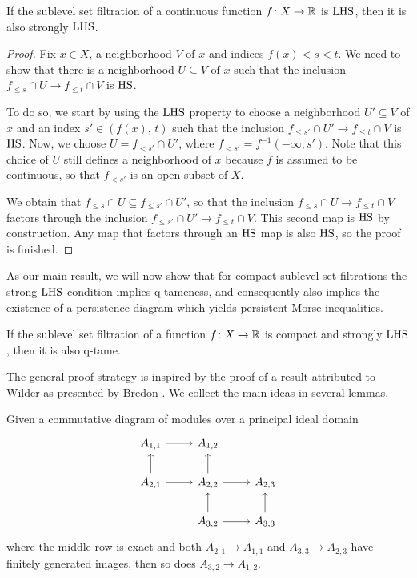 \begin{thm}\label{thm:hlc_to_strong_hlc}
    If the sublevel set filtration of a continuous function $f \colon X \to \mathbb{R}$ is $\mathrm{LHS}$, then it is also strongly $\mathrm{LHS}$.
\end{thm}
\begin{proof}
    Fix $x \in X$, a neighborhood $V$ of $x$ and indices $f(x) < s < t$.
	We need to show that there is a neighborhood $U \subseteq V$ of $x$ such that the inclusion $f_{\leq s} \cap U \to f_{\leq t} \cap V$ is $\mathrm{HS}$.
    
    To do so, we start by using the $\mathrm{LHS}$ property to choose a neighborhood $U' \subseteq V$ of $x$ and an index $s' \in (f(x),\, t)$ such that the inclusion $f_{\leq s'} \cap U' \to f_{\leq t} \cap V$ is $\mathrm{HS}$.
    Now, we choose $U = f_{< s'} \cap U'$, where $f_{< s'} = f^{-1} (-\infty, s')$.
    Note that this choice of $U$ still defines a neighborhood of $x$ because $f$ is assumed to be continuous, so that $f_{< s'}$ is an open subset of $X$.
    
    We obtain that $f_{\leq s} \cap U \subseteq f_{\leq s'} \cap U'$, so that the inclusion $f_{\leq s} \cap U \to f_{\leq t} \cap V$ factors through the inclusion $f_{\leq s'} \cap U' \to f_{\leq t} \cap V$.
	This second map is $\mathrm{HS}$ by construction.
	Any map that factors through an $\mathrm{HS}$ map is also $\mathrm{HS}$, so the proof is finished.
\end{proof}

As our main result, we will now show that for compact sublevel set filtrations the strong $\mathrm{LHS}$ condition implies \mbox{q-tameness}, and consequently also implies the existence of a persistence diagram which yields persistent Morse inequalities.

\begin{thm} \label{t:strong local connectedness implies q-tameness}
	If the sublevel set filtration of a function $f \colon X \to \mathbb{R}$ is compact and strongly $\mathrm{LHS}$, then it is also q-tame.
\end{thm}

The general proof strategy is inspired by the proof of a result attributed to Wilder as presented by Bredon \cite[Section II.17]{Bredon.1997}.
We collect the main ideas in several lemmas.

\begin{lem} \label{l:commutative algebra}
	Given a commutative diagram of modules over a principal ideal domain
	\begin{equation*}
	\begin{tikzcd}
	A_{1,1} \arrow[r] & A_{1,2} & \\
	A_{2,1} \arrow[r] \arrow[u] & A_{2,2} \arrow[r] \arrow[u] & A_{2,3} \\
	& A_{3,2} \arrow[r] \arrow[u] & A_{3,3} \arrow[u]
	\end{tikzcd}
	\end{equation*}
	where the middle row is exact and both $A_{2,1} \to A_{1,1}$ and $A_{3,3} \to A_{2,3}$ have finitely generated images, then so does $A_{3,2} \to A_{1,2}$.
\end{lem}

